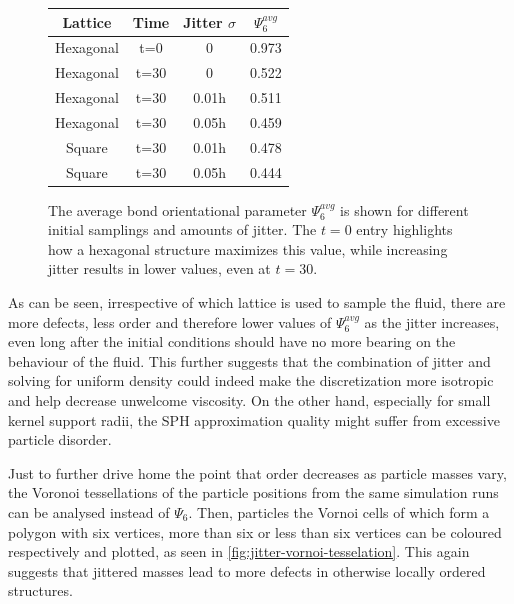 \begin{samepage}
  \begin{figure}[H]
    \begin{center}
      \begin{tabular}{|c | c | c || c|}
        \hline
        Lattice   & Time & Jitter $\sigma$ & $\Psi_6^{avg}$ \\
        \hline\hline
        Hexagonal & t=0  & 0               & 0.973          \\\hline
        Hexagonal & t=30 & 0               & 0.522          \\\hline
        Hexagonal & t=30 & 0.01h           & 0.511          \\\hline
        Hexagonal & t=30 & 0.05h           & 0.459          \\\hline
        Square    & t=30 & 0.01h           & 0.478          \\\hline
        Square    & t=30 & 0.05h           & 0.444          \\\hline
      \end{tabular}
      \caption{The average bond orientational parameter $\Psi_6^{avg}$ is shown for different initial samplings and amounts of jitter. The $t=0$ entry highlights how a hexagonal structure maximizes this value, while increasing jitter results in lower values, even at $t=30$.}
      \label{tbl:hexatic-order}
    \end{center}
  \end{figure}
\end{samepage}


As can be seen, irrespective of which lattice is used to sample the fluid, there are more defects, less order and therefore lower values of $\Psi_6^{avg}$ as the jitter increases, even long after the initial conditions should have no more bearing on the behaviour of the fluid. This further suggests that the combination of jitter and solving for uniform density could indeed make the discretization more isotropic and help decrease unwelcome viscosity. On the other hand, especially for small kernel support radii, the SPH approximation quality might suffer from excessive particle disorder.

Just to further drive home the point that order decreases as particle masses vary, the Voronoi tessellations of the particle positions from the same simulation runs can be analysed instead of $\Psi_6$. Then, particles the Vornoi cells of which form a polygon with six vertices, more than six or less than six vertices can be coloured respectively and plotted, as seen in \autoref{fig:jitter-vornoi-tesselation}. This again suggests that jittered masses lead to more defects in otherwise locally ordered structures.


